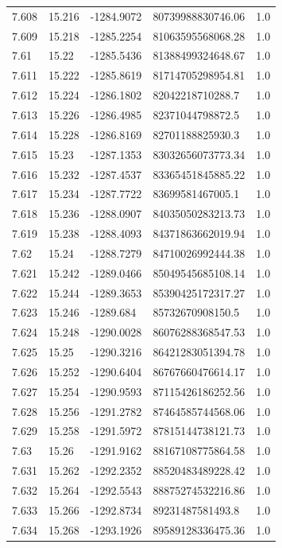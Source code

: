 \begin{tabular}{lllll}
7.608 & 15.216 & -1284.9072 & 80739988830746.06 & 1.0 \\
7.609 & 15.218 & -1285.2254 & 81063595568068.28 & 1.0 \\
7.61 & 15.22 & -1285.5436 & 81388499324648.67 & 1.0 \\
7.611 & 15.222 & -1285.8619 & 81714705298954.81 & 1.0 \\
7.612 & 15.224 & -1286.1802 & 82042218710288.7 & 1.0 \\
7.613 & 15.226 & -1286.4985 & 82371044798872.5 & 1.0 \\
7.614 & 15.228 & -1286.8169 & 82701188825930.3 & 1.0 \\
7.615 & 15.23 & -1287.1353 & 83032656073773.34 & 1.0 \\
7.616 & 15.232 & -1287.4537 & 83365451845885.22 & 1.0 \\
7.617 & 15.234 & -1287.7722 & 83699581467005.1 & 1.0 \\
7.618 & 15.236 & -1288.0907 & 84035050283213.73 & 1.0 \\
7.619 & 15.238 & -1288.4093 & 84371863662019.94 & 1.0 \\
7.62 & 15.24 & -1288.7279 & 84710026992444.38 & 1.0 \\
7.621 & 15.242 & -1289.0466 & 85049545685108.14 & 1.0 \\
7.622 & 15.244 & -1289.3653 & 85390425172317.27 & 1.0 \\
7.623 & 15.246 & -1289.684 & 85732670908150.5 & 1.0 \\
7.624 & 15.248 & -1290.0028 & 86076288368547.53 & 1.0 \\
7.625 & 15.25 & -1290.3216 & 86421283051394.78 & 1.0 \\
7.626 & 15.252 & -1290.6404 & 86767660476614.17 & 1.0 \\
7.627 & 15.254 & -1290.9593 & 87115426186252.56 & 1.0 \\
7.628 & 15.256 & -1291.2782 & 87464585744568.06 & 1.0 \\
7.629 & 15.258 & -1291.5972 & 87815144738121.73 & 1.0 \\
7.63 & 15.26 & -1291.9162 & 88167108775864.58 & 1.0 \\
7.631 & 15.262 & -1292.2352 & 88520483489228.42 & 1.0 \\
7.632 & 15.264 & -1292.5543 & 88875274532216.86 & 1.0 \\
7.633 & 15.266 & -1292.8734 & 89231487581493.8 & 1.0 \\
7.634 & 15.268 & -1293.1926 & 89589128336475.36 & 1.0 \\

\end{tabular}
